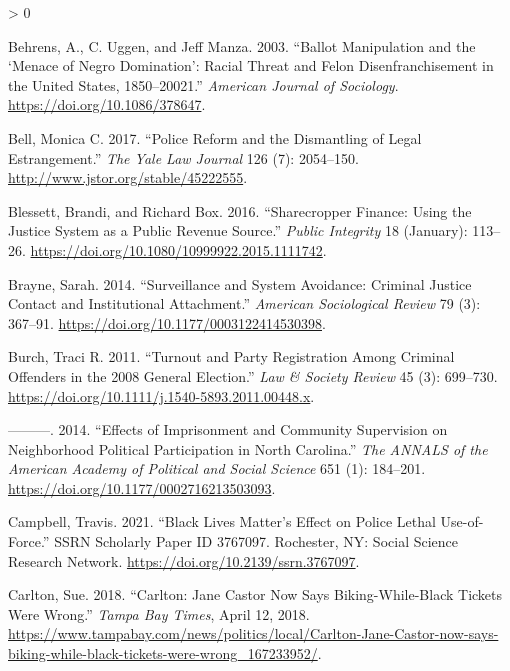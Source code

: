 \documentclass[
  12pt,
]{article}
\newlength{\cslhangindent}
\newenvironment{CSLReferences}[2] %
 {%
  \setlength{\parindent}{0pt}
  \ifodd #1 \everypar{\setlength{\hangindent}{\cslhangindent}}\ignorespaces\fi
  \ifnum #2 > 0
  \setlength{\parskip}{#2\baselineskip}
  \fi
 }%
 {}
\begin{document}
\hypertarget{refs}{}
\begin{CSLReferences}{1}{0}
\leavevmode\hypertarget{ref-Behrens2003}{}%
Behrens, A., C. Uggen, and Jeff Manza. 2003. {``Ballot {Manipulation} and the {`{Menace} of {Negro Domination}'}: {Racial Threat} and {Felon Disenfranchisement} in the {United States}, 1850--20021.''} \emph{American Journal of Sociology}. \url{https://doi.org/10.1086/378647}.

\leavevmode\hypertarget{ref-Bell2017}{}%
Bell, Monica C. 2017. {``Police {Reform} and the {Dismantling} of {Legal Estrangement}.''} \emph{The Yale Law Journal} 126 (7): 2054--150. \url{http://www.jstor.org/stable/45222555}.

\leavevmode\hypertarget{ref-Blessett2016}{}%
Blessett, Brandi, and Richard Box. 2016. {``Sharecropper {Finance}: {Using} the {Justice System} as a {Public Revenue Source}.''} \emph{Public Integrity} 18 (January): 113--26. \url{https://doi.org/10.1080/10999922.2015.1111742}.

\leavevmode\hypertarget{ref-Brayne2014}{}%
Brayne, Sarah. 2014. {``Surveillance and {System Avoidance}: {Criminal Justice Contact} and {Institutional Attachment}.''} \emph{American Sociological Review} 79 (3): 367--91. \url{https://doi.org/10.1177/0003122414530398}.

\leavevmode\hypertarget{ref-Burch2011}{}%
Burch, Traci R. 2011. {``Turnout and {Party Registration} Among {Criminal Offenders} in the 2008 {General Election}.''} \emph{Law \& Society Review} 45 (3): 699--730. \url{https://doi.org/10.1111/j.1540-5893.2011.00448.x}.

\leavevmode\hypertarget{ref-Burch2014}{}%
---------. 2014. {``Effects of {Imprisonment} and {Community Supervision} on {Neighborhood Political Participation} in {North Carolina}.''} \emph{The ANNALS of the American Academy of Political and Social Science} 651 (1): 184--201. \url{https://doi.org/10.1177/0002716213503093}.

\leavevmode\hypertarget{ref-Campbell2021}{}%
Campbell, Travis. 2021. {``Black {Lives Matter}'s {Effect} on {Police Lethal Use}-of-{Force}.''} SSRN Scholarly Paper ID 3767097. {Rochester, NY}: {Social Science Research Network}. \url{https://doi.org/10.2139/ssrn.3767097}.

\leavevmode\hypertarget{ref-Carlton2018}{}%
Carlton, Sue. 2018. {``Carlton: {Jane Castor} Now Says Biking-While-Black Tickets Were Wrong.''} \emph{Tampa Bay Times}, April 12, 2018. \url{https://www.tampabay.com/news/politics/local/Carlton-Jane-Castor-now-says-biking-while-black-tickets-were-wrong_167233952/}.


\end{CSLReferences}
\end{document}

